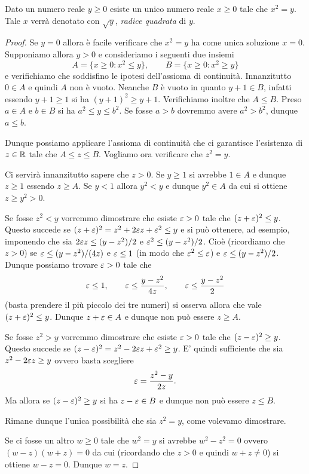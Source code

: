 \begin{theorem}
\label{th:radice_quadrata}
\mymark{***}
Dato un numero reale $y\ge 0$ esiste un unico
numero reale $x\ge 0$ tale che $x^2=y$.
Tale $x$ verrà denotato con $\sqrt y$, \emph{radice quadrata} di $y$.
\mymargin{$\sqrt{\cdot}$}
\end{theorem}
\begin{proof}
\mymark{*}
Se $y=0$ allora è facile verificare che $x^2=y$ ha come unica soluzione $x=0$.
Supponiamo allora $y>0$ e
consideriamo i seguenti due insiemi
\[
  A = \{x\ge 0 \colon x^2 \le y\},\qquad
  B = \{x\ge 0 \colon x^2 \ge y\}
\]
e verifichiamo che soddisfino le ipotesi dell'assioma di continuità.
Innanzitutto $0\in A$ e quindi $A$ non è vuoto.
Neanche $B$ è vuoto in quanto $y+1\in B$,
infatti essendo $y+1\ge 1$ si ha
$(y+1)^2 \ge y+1$. Verifichiamo inoltre che $A \le B$.
Preso $a\in A$ e $b\in B$ si ha $a^2 \le y \le b^2$.
Se fosse $a>b$ dovremmo avere $a^2>b^2$, dunque $a \le b$.

Dunque possiamo applicare l'assioma di continuità
che ci garantisce l'esistenza di $z\in \mathbb R$ tale che $A \le z \le B$.
Vogliamo ora verificare che $z^2 = y$.

Ci servirà innanzitutto sapere che $z>0$. Se $y\ge 1$ si avrebbe $1\in A$
e dunque $z\ge 1$ essendo $z\ge A$. Se $y<1$ allora $y^2 < y$ e dunque $y^2 \in A$
da cui si ottiene $z\ge y^2 > 0$.

Se fosse $z^2 < y$ vorremmo dimostrare che esiste $\varepsilon>0$ tale che
$(z+\varepsilon)^2 \le y$.
Questo succede se $(z+\varepsilon)^2 = z^2 + 2 \varepsilon z + \varepsilon^2 \le y$
e si può ottenere, ad esempio,
imponendo che sia $2\varepsilon z \le (y-z^2)/2$ e $\varepsilon^2 \le (y-z^2)/2$.
Cioè (ricordiamo che $z>0$) se $\varepsilon \le (y-z^2)/(4z)$ e $\varepsilon \le 1$
(in modo che $\varepsilon^2 \le \varepsilon$)
e $\varepsilon \le (y-z^2)/2$. Dunque possiamo
trovare $\varepsilon>0$
tale che
\[
\varepsilon \le 1, \qquad
\varepsilon \le \frac{y-z^2}{4z}, \qquad
\varepsilon \le \frac{y-z^2}2
\]
(basta prendere il più piccolo dei tre numeri)
si osserva allora
che vale $(z+\varepsilon)^2\le y$.
Dunque $z+\varepsilon \in A$ e dunque non può essere $z\ge A$.

Se fosse $z^2 > y$ vorremmo dimostrare che esiste $\varepsilon>0$ tale che
$(z-\varepsilon)^2 \ge y$.
Questo succede se $(z-\varepsilon)^2 = z^2 - 2\varepsilon z + \varepsilon^2 \ge y$.
E' quindi sufficiente che sia $z^2 - 2 \varepsilon z \ge y$ ovvero basta scegliere
\[
  \varepsilon = \frac{z^2-y}{2z}.
\]
Ma allora se $(z-\varepsilon)^2\ge y$ si ha $z-\varepsilon \in B$ e dunque non può
essere $z \le B$.

Rimane dunque l'unica possibilità che sia $z^2 = y$, come volevamo dimostrare.

Se ci fosse un altro $w\ge 0$ tale che $w^2 = y$ si avrebbe $w^2 - z^2=0$ ovvero
$(w-z)(w+z)=0$ da cui (ricordando che $z>0$ e quindi $w+z\neq 0$)
si ottiene $w-z=0$. Dunque $w=z$.
\end{proof}


